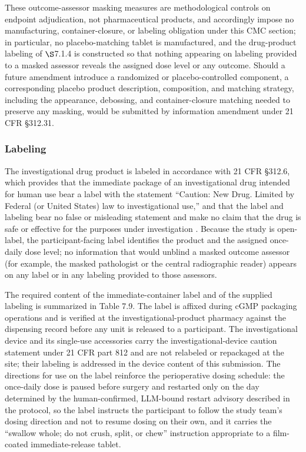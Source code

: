 These outcome-assessor
masking measures are methodological controls on endpoint adjudication, not
pharmaceutical products, and accordingly impose no manufacturing,
container-closure, or labeling obligation under this CMC section; in particular,
no placebo-matching tablet is manufactured, and the drug-product labeling of
$\S$7.1.4 is constructed so that nothing appearing on labeling provided to a
masked assessor reveals the assigned dose level or any outcome. Should a future
amendment introduce a randomized or placebo-controlled component, a corresponding
placebo product description, composition, and matching strategy, including the
appearance, debossing, and container-closure matching needed to preserve any
masking, would be submitted by information amendment under 21 CFR \S 312.31.

\subsubsection{Labeling}

The investigational drug product is labeled in accordance with 21 CFR \S 312.6,
which provides that the immediate package of an investigational drug intended for
human use bear a label with the statement ``Caution: New Drug. Limited by Federal
(or United States) law to investigational use,'' and that the label and labeling
bear no false or misleading statement and make no claim that the drug is safe or
effective for the purposes under investigation \cite{phase1guidance}. Because the
study is open-label, the participant-facing label identifies the product and the
assigned once-daily dose level; no information that would unblind a masked outcome
assessor (for example, the masked pathologist or the central radiographic reader)
appears on any label or in any labeling provided to those assessors. 

The required
content of the immediate-container label and of the supplied labeling is
summarized in Table 7.9. The label is affixed during cGMP packaging operations and
is verified at the investigational-product pharmacy against the dispensing record
before any unit is released to a participant. The investigational device and its
single-use accessories carry the investigational-device caution statement under
21 CFR part 812 and are not relabeled or repackaged at the site; their labeling is
addressed in the device content of this submission. The directions for use on the
label reinforce the perioperative dosing schedule: the once-daily dose is paused
before surgery and restarted only on the day determined by the human-confirmed,
LLM-bound restart advisory described in the protocol, so the label instructs the
participant to follow the study team's dosing direction and not to resume dosing
on their own, and it carries the ``swallow whole; do not crush, split, or chew''
instruction appropriate to a film-coated immediate-release tablet.


